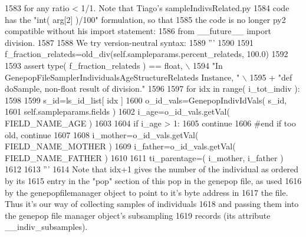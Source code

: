 \begin{DoxyCode}
1583 \textcolor{stringliteral}{                for any ratio < 1/1.  Note that Tiago's sampleIndivsRelated.py}
1584 \textcolor{stringliteral}{                code has the  "int( arg[2] )/100" formulation, so that}
1585 \textcolor{stringliteral}{                the code is no longer py2 compatible without his import statement:}
1586 \textcolor{stringliteral}{                from \_\_future\_\_ import division.}
1587 \textcolor{stringliteral}{}
1588 \textcolor{stringliteral}{                We try version-neutral syntax:}
1589 \textcolor{stringliteral}{                '''}
1590 
1591                 f\_fraction\_relateds=old\_div(self.sampleparams.percent\_relateds, 100.0)
1592 
1593                 \textcolor{keyword}{assert} type( f\_fraction\_relateds ) == float,  \(\backslash\)
1594                         \textcolor{stringliteral}{"In GenepopFileSamplerIndividualsAgeStructureRelateds Instance, "} \(\backslash\)
1595                                 + \textcolor{stringliteral}{"def doSample, non-float result of division."}
1596 
1597                 \textcolor{keywordflow}{for} idx \textcolor{keywordflow}{in} range( i\_tot\_indiv ):
1598 
1599                     s\_id=ls\_id\_list[ idx ]
1600                     o\_id\_vals=GenepopIndivIdVals( s\_id, 
1601                                         self.sampleparams.fields )
1602                     i\_age=o\_id\_vals.getVal( FIELD\_NAME\_AGE )
1603 
1604                     \textcolor{keywordflow}{if} i\_age > 1:
1605                         \textcolor{keywordflow}{continue}
1606                     \textcolor{comment}{#end if too old, continue}
1607 
1608                     i\_mother=o\_id\_vals.getVal( FIELD\_NAME\_MOTHER )
1609                     i\_father=o\_id\_vals.getVal( FIELD\_NAME\_FATHER )
1610 
1611                     ti\_parentage=( i\_mother, i\_father )
1612 
1613                     \textcolor{stringliteral}{'''}
1614 \textcolor{stringliteral}{                    Note that idx+1 gives the number of the individual as ordered by its}
1615 \textcolor{stringliteral}{                    entry in the "pop" section of this pop in the genepop file, as used}
1616 \textcolor{stringliteral}{                    by the genepopfilemanager object to point to it's byte address in }
1617 \textcolor{stringliteral}{                    the file.  Thus it's our way of collecting samples of individuals }
1618 \textcolor{stringliteral}{                    and passing them into the genepop file manager object's subsampling }
1619 \textcolor{stringliteral}{                    records (its attribute \_\_indiv\_subsamples).}

\end{DoxyCode}
